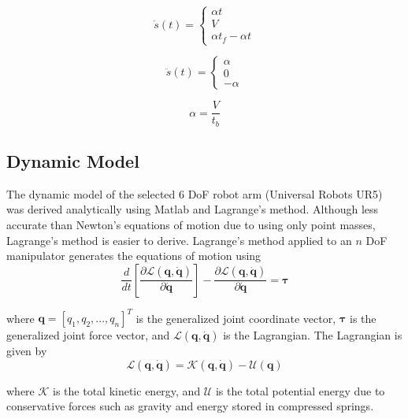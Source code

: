 \documentclass[conference]{IEEEtran}
\begin{document}
\begin{equation*}
  \dot{s}(t) =
  \begin{cases}
    \alpha t \\
    V \\
    \alpha t_f - \alpha t
  \end{cases}
\end{equation*}

\begin{equation*}
  \ddot{s}(t) =
  \begin{cases}
    \alpha \\
    0 \\
    -\alpha
  \end{cases}
\end{equation*}

\begin{equation*}
  \alpha = \frac{V}{t_b}
\end{equation*}

\subsection{Dynamic Model}
The dynamic model of the selected 6 DoF robot arm (Universal Robots UR5) was
derived analytically using Matlab and Lagrange's method. Although less accurate
than Newton's equations of motion due to using only point masses, Lagrange's
method is easier to derive. Lagrange's method applied to an $n$ DoF manipulator
generates the equations of motion using
\begin{equation*}
  \frac{d}{dt} \left[ \frac{\partial \mathcal{L}(\boldsymbol{q}, \dot{\boldsymbol{q}})}{\partial \dot{\boldsymbol{q}}} \right] - \frac{\partial \mathcal{L}(\boldsymbol{q}, \dot{\boldsymbol{q}})}{\partial \dot{\boldsymbol{q}}} = \boldsymbol{\tau}
\end{equation*}

where $\boldsymbol{q}=[q_1, q_2, ..., q_n]^T$ is the generalized joint
coordinate vector, $\boldsymbol{\tau}$ is the generalized joint force vector,
and $\mathcal{L}(\boldsymbol{q}, \dot{\boldsymbol{q}})$ is the Lagrangian. The
Lagrangian is given by
\begin{equation*}
  \mathcal{L}(\boldsymbol{q}, \dot{\boldsymbol{q}}) = \mathcal{K}(\boldsymbol{q}, \dot{\boldsymbol{q}}) - \mathcal{U}(\boldsymbol{q})
\end{equation*}

where $\mathcal{K}$ is the total kinetic energy, and $\mathcal{U}$ is the total
potential energy due to conservative forces such as gravity and energy stored in
compressed springs.
\end{document}
